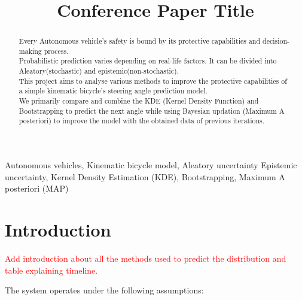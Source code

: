 \documentclass[conference]{IEEEtran}
\begin{document}
\title{Conference Paper Title\\
}

\author{

}

\maketitle

\begin{abstract}
Every Autonomous vehicle's safety is bound by its protective capabilities and decision-making process.\\ Probabilistic prediction varies depending on real-life factors. It can be divided into Aleatory(stochastic) and epistemic(non-stochastic). \\
This project aims to analyse various methods to improve the protective capabilities of a simple kinematic bicycle's steering angle prediction model.\\
We primarily compare and combine the KDE (Kernel Density Function) and Bootstrapping to predict the next angle while using Bayesian updation (Maximum A posteriori) to improve the model with the obtained data of previous iterations.
\end{abstract}

\begin{IEEEkeywords}
Autonomous vehicles, Kinematic bicycle model, Aleatory uncertainty
Epistemic uncertainty, Kernel Density Estimation (KDE),
Bootstrapping, Maximum A posteriori (MAP)
\end{IEEEkeywords}

\section{Introduction}
\textcolor{red}{Add introduction about all the methods used to predict the distribution and table explaining timeline.\\ }

The system operates under the following assumptions:
\end{document}
